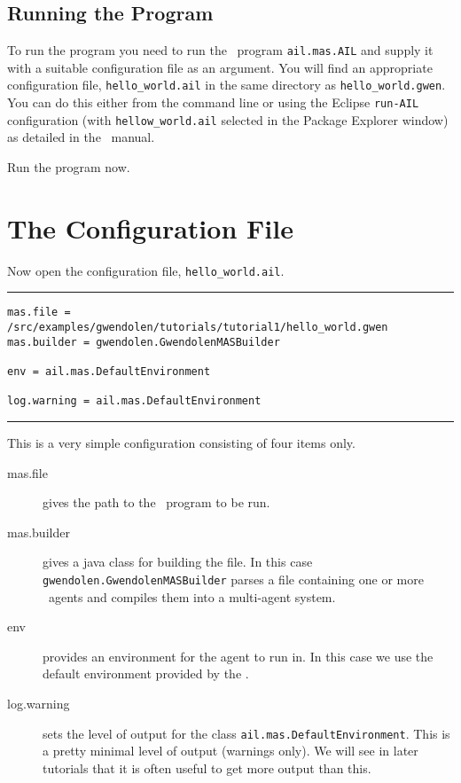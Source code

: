 \documentclass[a4]{article}
\begin{document}
\subsection{Running the Program}

To run the program you need to run the \java\ program \texttt{ail.mas.AIL} and supply it with a suitable configuration file as an argument.  You will find an appropriate configuration file, \texttt{hello\_world.ail} in the same directory as \texttt{hello\_world.gwen}.  You can do this either from the command line or using the Eclipse \texttt{run-AIL} configuration (with \texttt{hellow\_world.ail} selected in the Package Explorer window) as detailed in the \mcapl\ manual.

Run the program now.

\section{The Configuration File}
Now open the configuration file, \texttt{hello\_world.ail}.

\noindent\rule{\textwidth}{1pt}
\begin{verbatim}
mas.file = /src/examples/gwendolen/tutorials/tutorial1/hello_world.gwen
mas.builder = gwendolen.GwendolenMASBuilder

env = ail.mas.DefaultEnvironment

log.warning = ail.mas.DefaultEnvironment
\end{verbatim}
\rule{\textwidth}{1pt}

This is a very simple configuration consisting of four items only.
\begin{description}
\item[mas.file] gives the path to the \gwendolen\ program to be run.
\item[mas.builder] gives a java class for building the file.  In this case \texttt{gwendolen.GwendolenMASBuilder} parses a file containing one or more \gwendolen\ agents and compiles them into a multi-agent system.
\item[env] provides an environment for the agent to run in.  In this case we use the default environment provided by the \ail.
\item[log.warning] sets the level of output for the class \texttt{ail.mas.DefaultEnvironment}.  This is a pretty minimal level of output (warnings only).  We will see in later tutorials that it is often useful to get more output than this.
\end{description}
\end{document}
